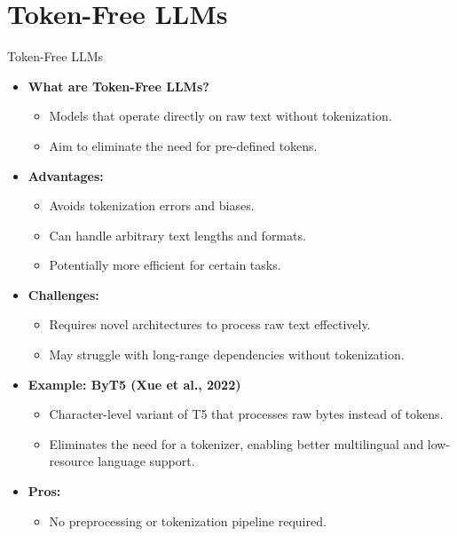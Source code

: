\section{Token-Free LLMs}
\begin{frame}[allowframebreaks]{Token-Free LLMs}
    \begin{itemize}
        \item \textbf{What are Token-Free LLMs?}
        \begin{itemize}
            \item Models that operate directly on raw text without tokenization.
            \item Aim to eliminate the need for pre-defined tokens.
        \end{itemize}
        \item \textbf{Advantages:}
        \begin{itemize}
            \item Avoids tokenization errors and biases.
            \item Can handle arbitrary text lengths and formats.
            \item Potentially more efficient for certain tasks.
        \end{itemize}
        \item \textbf{Challenges:}
        \begin{itemize}
            \item Requires novel architectures to process raw text effectively.
            \item May struggle with long-range dependencies without tokenization.
        \end{itemize}
    \end{itemize}
\framebreak
    \begin{itemize}
        \item \textbf{Example: ByT5 (Xue et al., 2022)}
        \begin{itemize}
            \item Character-level variant of T5 that processes raw bytes instead of tokens.
            \item Eliminates the need for a tokenizer, enabling better multilingual and low-resource language support.
        \end{itemize}
        \item \textbf{Pros:}
        \begin{itemize}
            \item No preprocessing or tokenization pipeline required.

\end{itemize}
\end{itemize}
\end{frame}
